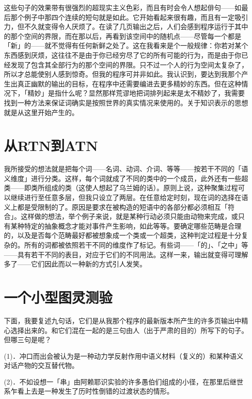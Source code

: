 \documentclass[
  12pt,
  twoside,
  openright,
  oldfontcommands,
]{memoir}
\begin{document}
这些句子的效果带有很强烈的超现实主义色彩，而且有时会令人想起俳句------如最后那个例子中那四个连续的短句就是如此。它开始看起来很有趣，而且有一定吸引力，但不久就变得令人厌烦了。在读了几页输出之后，人们会感到程序运行于其中的那个空间的界限，而在那以后，再看到该空间中的随机点------尽管每一个都是「新」的------就不觉得有任何新鲜之处了。这在我看来是个一般规律：你若对某个东西感到厌烦，这往往不是由于你已经穷尽了它的所有可能的行为，而是由于你已经发现了包含其全部行为的那个空间的界限。只不过一个人的行为空间太复杂了，所以才总能使别人感到惊奇。但我的程序可并非如此。我认识到，要达到我那个产生出真正幽默的输出的目标，在程序中还需要编进去更多精妙的东西。但在这种情况下，「精妙」是指什么呢？显然那样荒谬地把词排列起来是太不精妙了，我需要找到一种方法来保证词确实是按照世界的真实情况来使用的。关于知识表示的思想就是从这里开始产生的。

\section{从RTN到ATN}

我所接受的想法就是把每个词------名词、动词、介词、等等------按若干不同的「语义维度」进行分类。这样，每个词就成了不同的类中的一个成员，此外还有一些超类------即类所组成的类（这使人想起了乌兰姆的话）。原则上说，这种聚集过程可以继续进行至任意多层，但我只设立了两层。在任意给定时刻，现在词的选择在语义上都是受限制的了。原因是要求在被构造的短语中的各部分都必须相互「符合」。这样做的想法，举个例子来说，就是某种行动必须只能由动物来完成，或只有某种特定的抽象概念才能对事件产生影响，如此等等。要确定哪些范畴是合理的，以及是否每个范畴最好都被想象成一个类或一个超类，这种判定过程是十分复杂的。所有的词都被依照若干不同的维度作了标记。有些词------「的」、「之中」等------具有若干不同的表目，对应于它们的不同用法。这样一来，输出就变得可理解多了------它们因此而以一种新的方式引人发笑。

\section{一个小型图灵测验}

下面，我要复述九句话，它们是从我那个程序的最新版本所产生的许多页输出中精心选择出来的。和它们混在一起的是三句由人（出于严肃的目的）所写下的句子。但哪三句是呢？

(1)．冲口而出会被认为是一种动力学反射作用中语义材料（复义的）和某种语义对话产物的交互替代物。

(2)．不如设想一「串」由阿赖耶识实验的许多愚伯们组成的小径，在那里后继世系乍看上去是一种发生了历时性倒错的过渡状态的情形。
\end{document}
